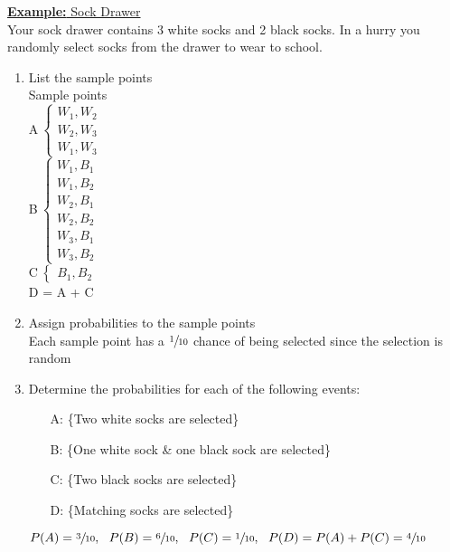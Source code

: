 \documentclass[a4paper]{article}
\let\bf\textbf
\begin{document}
\begin{shaded}
    \underline{\bf{Example:} Sock Drawer}
    \vspace{2mm}\\
    Your sock drawer contains 3 white socks and 2 black socks. In a hurry you randomly select socks from the drawer to wear to school.
    \begin{enumerate}
        \item List the sample points\\
        Sample points\\
        A$\
        \begin{cases}
            W_1,W_2\\
            W_2,W_3\\
            W_1,W_3
        \end{cases}$
        \vspace{1mm}\\
        B$\
        \begin{cases}
            W_1,B_1\\
            W_1,B_2\\
            W_2,B_1\\
            W_2,B_2\\
            W_3,B_1\\
            W_3,B_2
        \end{cases}$
        \vspace{1mm}\\
        C$\
        \begin{cases}
            B_1,B_2
        \end{cases}$
        \vspace{1mm}\\
        D = A + C
        \item Assign probabilities to the sample points\\
        Each sample point has a $\sfrac{1}{10}$ chance of being selected since the selection is random
        \item Determine the probabilities for each of the following events:
        \begin{itemize}
            \item[A:] \{Two white socks are selected\}
            \item[B:] \{One white sock \& one black sock are selected\}
            \item[C:] \{Two black socks are selected\}
            \item[D:] \{Matching socks are selected\} 
        \end{itemize}
        $P(A) = \sfrac{3}{10},\ \ P(B) = \sfrac{6}{10},\ \ P(C) = \sfrac{1}{10},\ \ P(D) = P(A) + P(C) = \sfrac{4}{10}$
    \end{enumerate}
\end{shaded}
\end{document}
